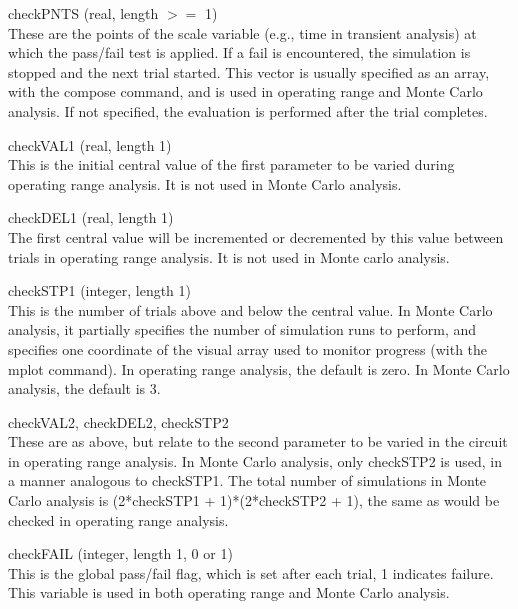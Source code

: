\begin{description}
\item{{\et checkPNTS} (real, length $>=$ 1)}\\
These are the points of the scale variable (e.g., time in transient
analysis) at which the pass/fail test is applied.  If a fail is
encountered, the simulation is stopped and the next trial started. 
This vector is usually specified as an array, with the {\cb compose}
command, and is used in operating range and Monte Carlo analysis.  If
not specified, the evaluation is performed after the trial completes.

\item{{\et checkVAL1} (real, length 1)}\\
This is the initial central value of the first parameter to be varied
during operating range analysis.  It is not used in Monte Carlo
analysis.

\item{{\et checkDEL1} (real, length 1)}\\
The first central value will be incremented or decremented by this
value between trials in operating range analysis.  It is not used in
Monte carlo analysis.

\item{{\et checkSTP1} (integer, length 1)}\\
This is the number of trials above and below the central value.  In
Monte Carlo analysis, it partially specifies the number of simulation
runs to perform, and specifies one coordinate of the visual array used
to monitor progress (with the {\cb mplot} command).  In operating
range analysis, the default is zero.  In Monte Carlo analysis, the
default is 3.

\item{\et checkVAL2, checkDEL2, checkSTP2}\\
These are as above, but relate to the second parameter to be varied in
the circuit in operating range analysis.  In Monte Carlo analysis,
only {\et checkSTP2} is used, in a manner analogous to {\et
checkSTP1}.  The total number of simulations in Monte Carlo analysis
is (2*{\et checkSTP1} + 1)*(2*{\et checkSTP2} + 1), the same as would
be checked in operating range analysis.

\item{{\et checkFAIL}  (integer, length 1, 0 or 1)}\\
This is the global pass/fail flag, which is set after each trial, 1
indicates failure.  This variable is used in both operating range and
Monte Carlo analysis.


\end{description}
